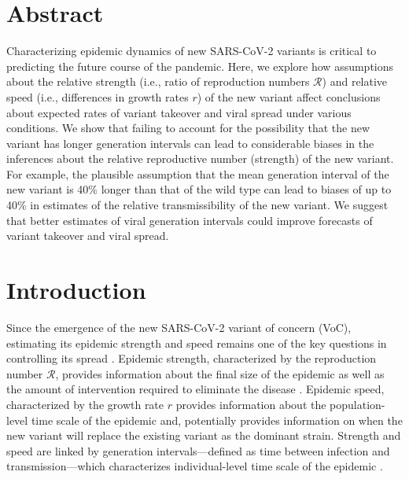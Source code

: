 \documentclass[12pt]{article}
\date{\today}
\newcommand{\RR}{\ensuremath{{\mathcal R}}\xspace}
\begin{document}
\begin{flushleft}{
	\Large
	\textbf{}
}
\end{flushleft}

\section*{Abstract}

Characterizing epidemic dynamics of new SARS-CoV-2 variants is critical to predicting the future course of the pandemic.
Here, we explore how assumptions about the relative strength (i.e., ratio of reproduction numbers $\RR$) and relative speed (i.e., differences in growth rates $r$) of the new variant affect conclusions about expected rates of variant takeover and viral spread under various conditions.
We show that failing to account for the possibility that the new variant has longer generation intervals can lead to considerable biases in the inferences about the relative reproductive number (strength) of the new variant.
For example, the plausible assumption that the mean generation interval of the new variant is 40\% longer than that of the wild type can lead to biases of up to 40\% in estimates of  the relative transmissibility of the new variant.
We suggest that better estimates of viral generation intervals could improve forecasts of variant takeover and viral spread. 

\section{Introduction}

Since the emergence of the new SARS-CoV-2 variant of concern (VoC), estimating its epidemic strength and speed remains one of the key questions in controlling its spread \citep{switzerland2021variant, davies2021estimated, di2021impact, leung2021early, volz2021transmission,zhao2021}.
Epidemic strength, characterized by the reproduction number $\RR$, provides information about the final size of the epidemic as well as the amount of intervention required to eliminate the disease \citep{anderson1991infectious}.
Epidemic speed, characterized by the growth rate $r$ provides information about the population-level time scale of the epidemic and, potentially provides information on when the new variant will replace the existing variant as the dominant strain.
Strength and speed are linked by generation intervals---defined as time between infection and transmission---which characterizes individual-level time scale of the epidemic \citep{roberts2007model,svensson2007note,wallinga2007generation}.
\end{document}
